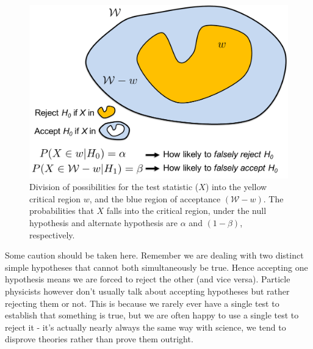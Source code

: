\begin{figure}[hbt!]
    \centering
    \includegraphics[width=\textwidth]{figures/Hypotest/type12.pdf}
    \caption{Division of possibilities for the test statistic ($X$) into the yellow critical region $w$, and the blue region of acceptance $(\mathcal{W}-w)$. The probabilities that $X$ falls into the critical region, under the null hypothesis and alternate hypothesis are $\alpha$ and $(1-\beta)$, respectively.}
    \label{fig:htestregions}
\end{figure}
Some caution should be taken here. Remember we are dealing with two distinct simple hypotheses that cannot both simultaneously be true. Hence accepting one hypothesis means we are forced to reject the other (and vice versa). Particle physicists however don't usually talk about accepting hypotheses but rather rejecting them or not. This is because we rarely ever have a single test to establish that something is true, but we are often happy to use a single test to reject it - it's actually nearly always the same way with science, we tend to disprove theories  rather than prove them outright.

